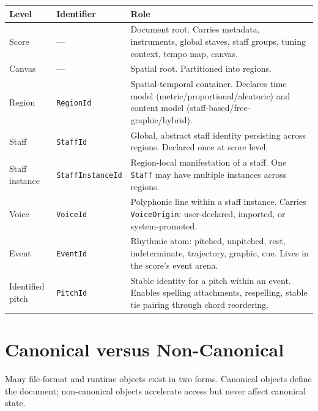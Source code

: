 \documentclass[11pt,letterpaper]{report}
\begin{document}
\begin{longtable}{p{2.8cm} p{2.6cm} p{8.2cm}}
  \toprule
  \textbf{Level} & \textbf{Identifier} & \textbf{Role} \\
  \midrule
  \endhead
  Score & --- & Document root. Carries metadata, instruments,
    global staves, staff groups, tuning context, tempo map,
    canvas. \\
  Canvas & --- & Spatial root. Partitioned into regions. \\
  Region & \texttt{RegionId} & Spatial-temporal container.
    Declares time model (metric/proportional/aleatoric) and
    content model (staff-based/free-graphic/hybrid). \\
  Staff & \texttt{StaffId} & Global, abstract staff identity
    persisting across regions. Declared once at score level. \\
  Staff instance & \texttt{StaffInstanceId} & Region-local
    manifestation of a staff. One \texttt{Staff} may have
    multiple instances across regions. \\
  Voice & \texttt{VoiceId} & Polyphonic line within a staff
    instance. Carries \texttt{VoiceOrigin}: user-declared,
    imported, or system-promoted. \\
  Event & \texttt{EventId} & Rhythmic atom: pitched, unpitched,
    rest, indeterminate, trajectory, graphic, cue. Lives in the
    score's event arena. \\
  Identified pitch & \texttt{PitchId} & Stable identity for a
    pitch within an event. Enables spelling attachments,
    respelling, stable tie pairing through chord reordering. \\
  \bottomrule
\end{longtable}

\section*{Canonical versus Non-Canonical}

Many file-format and runtime objects exist in two forms.
Canonical objects define the document; non-canonical objects
accelerate access but never affect canonical state.
\end{document}
